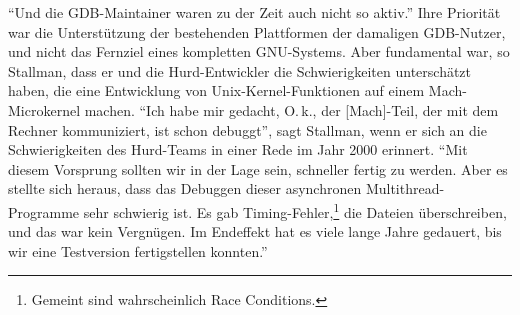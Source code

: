 "`Und die GDB-Maintainer waren zu der Zeit auch nicht so aktiv."' Ihre Priorität war die Unterstützung der bestehenden Plattformen der damaligen GDB-Nutzer, und nicht das Fernziel eines kompletten GNU-Systems. Aber fundamental war, so Stallman, dass er und die Hurd-Entwickler die Schwierigkeiten unterschätzt haben, die eine Entwicklung von Unix-Kernel-Funktionen auf einem Mach-Microkernel machen. "`Ich habe mir gedacht, O.\,k., der [Mach]-Teil, der mit dem Rechner kommuniziert, ist schon debuggt"', sagt Stallman, wenn er sich an die Schwierigkeiten des Hurd-Teams in einer Rede im Jahr 2000 erinnert. "`Mit diesem Vorsprung sollten wir in der Lage sein, schneller fertig zu werden. Aber es stellte sich heraus, dass das Debuggen dieser asynchronen Multithread-Programme sehr schwierig ist. Es gab Timing-Fehler,\footnote{Gemeint sind wahrscheinlich Race Conditions.} die Dateien überschreiben, und das war kein Vergnügen. Im Endeffekt hat es viele lange Jahre gedauert, bis wir eine Testversion fertigstellen konnten."'%

